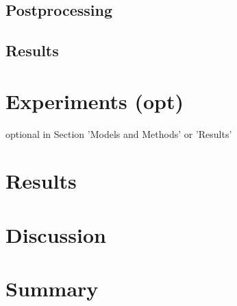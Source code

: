 \documentclass[10pt,conference,compsocconf]{IEEEtran}
\begin{document}
\subsection{Postprocessing}

\subsection{Results}

\section{Experiments (opt)}

optional in Section 'Models and Methods' or 'Results'

\section{Results}

\section{Discussion}


\section{Summary}




\end{document}
